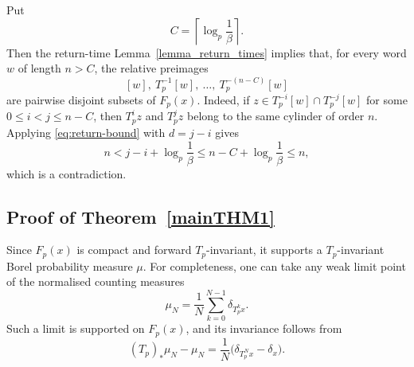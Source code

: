 \documentclass[11pt]{article}
\newtheorem{corollary}[theorem]{Corollary}
\theoremstyle{remark}
\newcommand{\Fp}{F_p}
\newcommand{\vp}[1]{{\color{red}  {#1}}}
\begin{document}

Put
\begin{equation} \label{eq:C}
    C=\left\lceil\log_p\frac{1}{\beta}\right\rceil.
\end{equation}
Then the return-time Lemma~\ref{lemma_return_times} implies that,
for every word $w$ of length $n>C$, the relative preimages
\begin{equation} \label{eq:disjoint-preimages}
    [w],\ T_p^{-1}[w],\ \ldots,\ T_p^{-(n-C)}[w]
\end{equation}
are pairwise disjoint subsets of $\Fp(x)$.  Indeed, if $z\in
T_p^{-i}[w]\cap T_p^{-j}[w]$ for some $0\leq i<j\leq n-C$, then
$T_p^iz$ and $T_p^jz$ belong to the same cylinder of order $n$.
Applying \eqref{eq:return-bound} with $d=j-i$ gives
\begin{equation} \label{eq:disjoint-contradiction}
    n<j-i+\log_p\frac{1}{\beta}
    \leq n-C+\log_p\frac{1}{\beta}
      \leq n,
\end{equation}
which is a contradiction.

\subsection{Proof of Theorem~\ref{mainTHM1}}\label{proof1}

Since $\Fp(x)$ is compact and forward $T_p$-invariant, it supports a
$T_p$-invariant Borel probability measure $\mu$.  For completeness,
one can take any weak limit point of the normalised counting
measures
\begin{equation} \label{eq:empirical-measures}
    \mu_N=\frac{1}{N}\sum_{k=0}^{N-1}\delta_{T_p^kx}.
\end{equation}
Such a limit is supported on $\Fp(x)$, and its invariance follows
from
\begin{equation} \label{eq:asymptotic-invariance}
    (T_p)_*\mu_N-\mu_N
    =\frac{1}{N}\bigl(\delta_{T_p^Nx}-\delta_x\bigr).
\end{equation}
\end{document}
